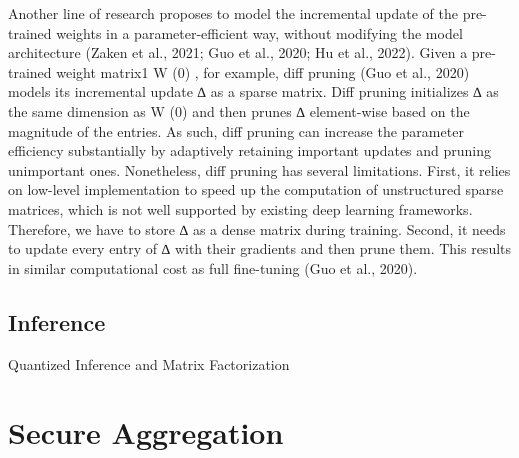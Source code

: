 \documentclass[withindex,glossary,firstyr]{cam-thesis}
\begin{document}
Another line of research proposes to model the incremental update of the pre-trained weights in a parameter-efficient way, without modifying the model architecture (Zaken et al., 2021; Guo et al., 2020; Hu et al., 2022). Given a pre-trained weight matrix1 W (0) , for example, diff pruning (Guo et al., 2020) models its incremental update ∆ as a sparse matrix. Diff pruning initializes ∆ as the same dimension as W (0) and then prunes ∆ element-wise based on the magnitude of the entries. As such, diff pruning can increase the parameter efficiency substantially by adaptively retaining important updates and pruning unimportant ones. Nonetheless, diff pruning has several limitations. First, it relies on low-level implementation to speed up the computation of unstructured sparse matrices, which is not well supported by existing deep learning frameworks. Therefore, we have to store ∆ as a dense matrix during training. Second, it needs to update every entry of ∆ with their gradients and then prune them. This results in similar computational cost as full fine-tuning (Guo et al., 2020).
\subsection{Inference}

Quantized Inference and Matrix Factorization

\section{Secure Aggregation}
\end{document}
